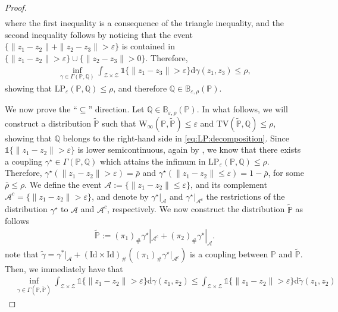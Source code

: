 \documentclass[11pt,a4paper]{article}
\begin{document}
\begin{proof}
\begin{align*}
\end{align*}
where the first inequality is a consequence of the triangle inequality, and the second inequality follows by noticing that the event $\{\|z_1 - z_2\| + \|z_2 - z_3\| > \varepsilon\}$ is contained in $\{\|z_1 - z_2\|>\varepsilon\} \cup \{\|z_2 - z_3\| > 0\}$. Therefore, 
\begin{align*}
    \inf_{\gamma\in\Gamma(\mathbb P,\mathbb Q)}\int_{\mathcal Z \times \mathcal Z} \mathds{1}\{\|z_1-z_3\|>\varepsilon\}\mathrm{d}\gamma(z_1,z_3) \leq \rho,
\end{align*}
showing that $\text{LP}_\varepsilon(\mathbb P, \mathbb Q) \leq \rho$, and therefore $\mathbb Q \in \mathbb{B}_{\varepsilon,\rho}(\mathbb P)$.

We now prove the ``$\subseteq$'' direction. Let $\mathbb Q \in \mathbb{B}_{\varepsilon,\rho}(\mathbb P)$. In what follows, we will construct a distribution $\widetilde{\mathbb P}$ such that $\text{W}_\infty(\mathbb P, \widetilde{\mathbb P})\leq \varepsilon$ and $\text{TV}(\widetilde{\mathbb P}, \mathbb Q)\leq \rho$, showing that $\mathbb Q$ belongs to the right-hand side in \eqref{eq:LP:decomposition}. Since $\mathds{1}\{\|z_1-z_2\|>\varepsilon\}$ is lower semicontinuous, again by \cite[Theorem 4.1]{villani2009optimal}, we know that there exists a coupling $\gamma^\star\in\Gamma(\mathbb P, \mathbb Q)$ which attains the infimum in $\text{LP}_\varepsilon(\mathbb P,\mathbb Q) \leq \rho$. Therefore, $\gamma^\star(\|z_1-z_2\|>\varepsilon) = \bar{\rho}$ and $\gamma^\star(\|z_1-z_2\|\leq\varepsilon) = 1-\bar{\rho}$, for some $\bar{\rho} \leq \rho$. We define the event $\mathcal A := \{\|z_1-z_2\|\leq\varepsilon\}$, and its complement $\mathcal A^c = \{\|z_1-z_2\|>\varepsilon\}$, and denote by $\gamma^\star|_{\mathcal A}$ and $\gamma^\star|_{\mathcal A^c}$ the restrictions of the distribution $\gamma^\star$ to $\mathcal A$ and $\mathcal A^c$, respectively. We now construct the distribution $\widetilde{\mathbb P}$ as follows
\begin{align*}
    \widetilde{\mathbb P} := (\pi_1)_\#\gamma^\star|_{\mathcal A^c} + (\pi_2)_\# \gamma^\star|_{\mathcal A}.
\end{align*}
note that ${\widetilde{\gamma}} = \gamma^*|_\mathcal{A} + (\text{Id} \times \text{Id})_\# \left((\pi_1)_\# \gamma^\star|_{\mathcal A^c}\right)$ is a coupling between $\mathbb P$ and $\widetilde{\mathbb P}$. Then, we immediately have that
\begin{align*}
    &\inf_{\gamma \in \Gamma(\mathbb P, \widetilde{\mathbb P})} \int_{\mathcal Z \times \mathcal Z} \mathds{1}\{\|z_1 - z_2\| > \varepsilon\} \mathrm{d} \gamma(z_1,z_2) \leq \int_{\mathcal Z \times \mathcal Z} \mathds{1}\{\|z_1 - z_2\| > \varepsilon\} \mathrm{d} \widetilde{\gamma}(z_1,z_2)

\end{align*}
\end{proof}
\end{document}
